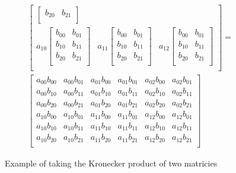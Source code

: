 \begin{figure}[H]
\begin{gather*}
\begin{bmatrix}
\begin{bmatrix}
                b_{20} & b_{21} \\
            \end{bmatrix} \\
            a_{10}
            \begin{bmatrix}
                b_{00} & b_{01} \\
                b_{10} & b_{11} \\
                b_{20} & b_{21} \\
            \end{bmatrix} 
            & a_{11}\begin{bmatrix}
                b_{00} & b_{01} \\
                b_{10} & b_{11} \\
                b_{20} & b_{21} \\
            \end{bmatrix} 
            & a_{12}\begin{bmatrix}
                b_{00} & b_{01} \\
                b_{10} & b_{11} \\
                b_{20} & b_{21} \\
            \end{bmatrix} \\
        \end{bmatrix}
        =\\
        \begin{bmatrix}
            a_{00}b_{00} & a_{00}b_{01} & a_{01}b_{00} & a_{01}b_{01} & a_{02}b_{00} & a_{02}b_{01}\\
            a_{00}b_{10} & a_{00}b_{11} & a_{01}b_{10} & a_{01}b_{11} & a_{02}b_{10} & a_{02}b_{11}\\
            a_{00}b_{20} & a_{00}b_{21} & a_{01}b_{20} & a_{01}b_{21} & a_{02}b_{20} & a_{02}b_{21}\\
            a_{10}b_{00} & a_{10}b_{01} & a_{11}b_{00} & a_{11}b_{01} & a_{12}b_{00} & a_{12}b_{01}\\
            a_{10}b_{10} & a_{10}b_{11} & a_{11}b_{10} & a_{11}b_{11} & a_{12}b_{10} & a_{12}b_{11}\\
            a_{10}b_{20} & a_{10}b_{21} & a_{11}b_{20} & a_{11}b_{21} & a_{12}b_{20} & a_{12}b_{21}\\
        \end{bmatrix}
    \end{gather*}    
    \caption{Example of taking the Kronecker product of two matricies}
    \label{fig:Kronecker_example}
\end{figure}

